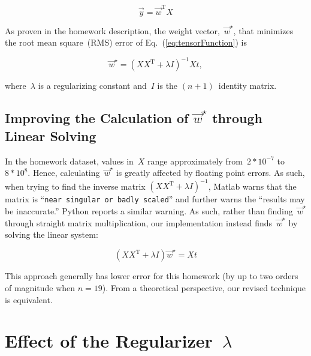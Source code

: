 \documentclass{report}
\newcommand{\eref}[1]{(\ref{#1})}
\newcommand{\wstar}{\vec{w}^{\star}}
\begin{document}
  \begin{equation}
    \vec{y}=\vec{w}^{\text{T}}X
  \end{equation}\label{eq:tensorFunction}
  
  \noindent
  As proven in the homework description, the weight vector,~$\wstar$, that minimizes the root mean square~(RMS) error of Eq.~\eref{eq:tensorFunction} is
  
  \begin{equation}
    \wstar=(XX^{\text{T}} + \lambda I)^{-1}Xt,
  \end{equation}\label{eq:wstarDef}
  
  \noindent
  where~$\lambda$ is a regularizing constant and~$I$ is the $(n+1)$~identity matrix.
  
  \subsection{Improving the Calculation of $\wstar$ through Linear Solving}
  
  In the homework dataset, values in~$X$ range approximately from~${2*10^{-7}}$ to~${8*10^{8}}$.  Hence, calculating~$\wstar$ is greatly affected by floating point errors.  As such, when trying to find the inverse matrix ${(XX^{\text{T}} + \lambda I)^{-1}}$, Matlab warns that the matrix is ``\texttt{near singular or badly scaled}''  and further warns the ``results may be inaccurate.''  Python reports a similar warning.  As such, rather than finding~$\wstar$ through straight matrix multiplication, our implementation instead finds~$\wstar$ by solving the linear system:
    
  \begin{equation}
    (XX^{\text{T}} + \lambda I)\wstar=Xt
  \end{equation}
  
  \noindent
  This approach generally has lower error for this homework (by up to two orders of magnitude when $n=19$).  From a theoretical perspective, our revised technique is equivalent.
      
  \section{Effect of the Regularizer~$\lambda$}
  
\end{document}
